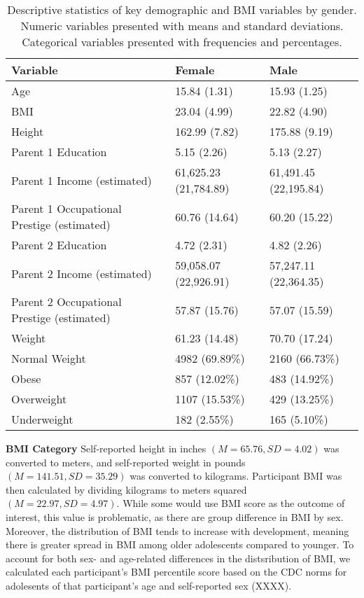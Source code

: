 \documentclass[man]{apa6}
\begin{document}
\begin{table}[tbp]
\begin{center}
\begin{threeparttable}
\caption{\label{tab:desc}Descriptive statistics of key demographic and BMI variables by gender. Numeric variables presented with means and standard deviations. Categorical variables presented with frequencies and percentages.}
\begin{tabular}{lll}
\toprule
Variable & Female & Male\\
\midrule
Age & 15.84 (1.31) & 15.93 (1.25)\\
BMI & 23.04 (4.99) & 22.82 (4.90)\\
Height & 162.99 (7.82) & 175.88 (9.19)\\
Parent 1 Education & 5.15 (2.26) & 5.13 (2.27)\\
Parent 1 Income (estimated) & 61,625.23 (21,784.89) & 61,491.45 (22,195.84)\\
Parent 1 Occupational Prestige (estimated) & 60.76 (14.64) & 60.20 (15.22)\\
Parent 2 Education & 4.72 (2.31) & 4.82 (2.26)\\
Parent 2 Income (estimated) & 59,058.07 (22,926.91) & 57,247.11 (22,364.35)\\
Parent 2 Occupational Prestige (estimated) & 57.87 (15.76) & 57.07 (15.59)\\
Weight & 61.23 (14.48) & 70.70 (17.24)\\
Normal Weight & 4982 (69.89\%) & 2160 (66.73\%)\\
Obese & 857 (12.02\%) & 483 (14.92\%)\\
Overweight & 1107 (15.53\%) & 429 (13.25\%)\\
Underweight & 182 (2.55\%) & 165 (5.10\%)\\
\bottomrule
\end{tabular}
\end{threeparttable}
\end{center}
\end{table}

\textbf{BMI Category} Self-reported height in inches \((M = 65.76, SD = 4.02)\) was converted to meters, and self-reported weight in pounds \((M = 141.51, SD = 35.29)\) was converted to kilograms. Participant BMI was then calculated by dividing kilograms to meters squared \((M = 22.97, SD = 4.97)\). While some would use BMI score as the outcome of interest, this value is problematic, as there are group difference in BMI by sex. Moreover, the distribution of BMI tends to increase with development, meaning there is greater spread in BMI among older adolescents compared to younger. To account for both sex- and age-related differences in the distsribution of BMI, we calculated each participant's BMI percentile score based on the CDC norms for adolesents of that participant's age and self-reported sex (XXXX).
\end{document}
